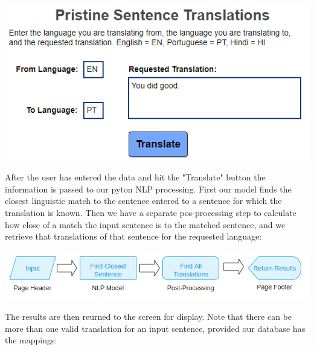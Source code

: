 \documentclass[runningheads]{llncs}
\begin{document}
	\begin{minipage}{\linewidth}
		\begin{center}
			\includegraphics[width=\linewidth]{Screen_top.png}
			\label{fig:Language Input}
			\vspace*{1cm}
		\end{center}
	\end{minipage}
	\afterpage{\clearpage}
After the user has entered the data and hit the "Translate" button the information is passed to our pyton NLP processing. First our model finds the closest linguistic match to the sentence entered to a sentence for which the translation is known. Then we have a separate pos-processing step to calculate how close of a match the input sentence is to the matched sentence, and we retrieve that translations of that sentence for the requested language:

	\begin{minipage}{\linewidth}
		\begin{center}
			\includegraphics[width=\linewidth]{Process_Map.png}
			\label{fig:Process Map}
			\vspace*{1cm}
		\end{center}
	\end{minipage}
	\afterpage{\clearpage}
The results are then reurned to the screen for display. Note that there can be more than one valid translation for an input sentence, provided our database has the mappings:
\end{document}

